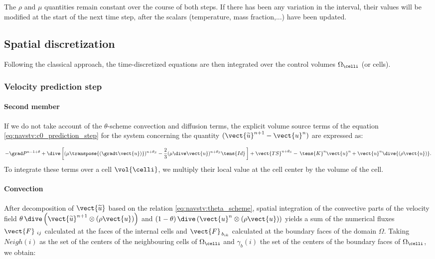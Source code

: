 \begin{remark}
The  $\rho$ and $\mu$ quantities remain constant over the course of both
steps. If there has been any variation in the interval, their values will be modified at the start of the next time step, after the scalars (temperature, mass fraction,...) have been updated.
\end{remark}

\subsection*{Spatial discretization}
Following the classical approach, the time-discretized equations are then integrated over the control volumes ${\Omega_\celli}$ (or cells).
\subsubsection*{Velocity prediction step}
\paragraph{Second member\\ }
If we do not take account of the $\theta$-scheme convection and diffusion
terms, the explicit volume source terms of the equation \eqref{eq:navstv:c0_prediction_step}
for the system concerning the quantity $(\vect{\widetilde{u}}^{n+1}-\vect {u}^{n})$
        are expressed as:

\begin{equation*}
 -\grad P^{n-1+\theta} + \dive \left[ (\mu \transpose{ \left( \gradt \vect{u}\right) })^{n+\theta_{S}}- \frac{2}{3} ( \mu  \dive \vect{u})^{n+\theta_{S}}\tens{Id} \,\right]+\vect{TS}^{n+\theta_{S}}- \,\tens{K}^{n} \vect{u}^{n}+\vect{u}^{n} \dive{(\rho\vect{u})}.
 \end{equation*}
To integrate these terms over a cell $\vol{\celli}$, we multiply their local value
at the cell center by the volume of the cell.

\paragraph{Convection  \\}

After decomposition of $\vect{\widetilde{u}}$ based on the relation
\eqref{eq:navstv:theta_scheme}, spatial integration of the convective
parts of the velocity field $\theta\,{\dive\left(\vect{\widetilde{u}}^{n+1}\otimes
(\rho \vect{u})\right)}$ and $(1-\theta)\,{\dive\left(
\vect{u}^{n}\otimes (\rho \vect{u})\right)}$ yields a sum of the numerical
fluxes ${\vect{F}\,_{\,ij}}$ calculated at the faces of the internal cells and ${\vect{F}_{\,b_{ik}}}$ calculated at the boundary faces of the domain $\Omega$.
Taking $Neigh(i)$ as the set of the centers of the neighbouring cells of
${\Omega_\celli}$ and $\gamma_b(i)$ the set of the centers of the boundary faces of
${\Omega_\celli}$, we obtain:

